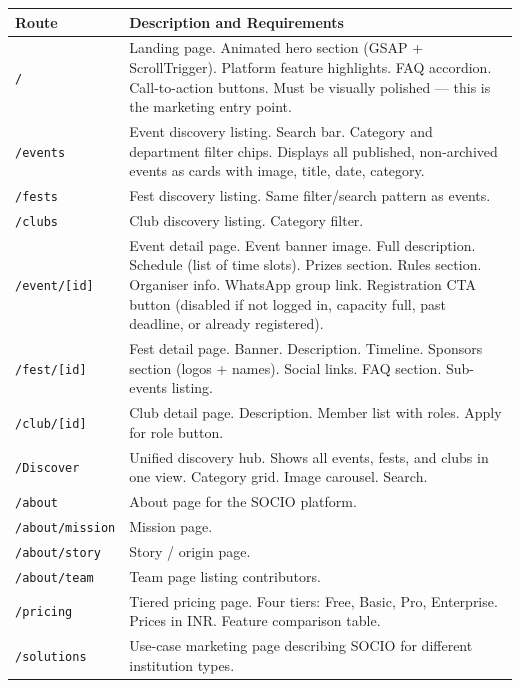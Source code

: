 \documentclass[12pt,a4paper]{article}
\begin{document}
\begin{longtable}{L{5cm} X}
\toprule
{}
\textbf{Route} & \textbf{Description and Requirements} \\
\midrule
\endhead
\texttt{/} & Landing page. Animated hero section (GSAP + ScrollTrigger). Platform feature highlights. FAQ accordion. Call-to-action buttons. Must be visually polished — this is the marketing entry point. \\
\addlinespace
\texttt{/events} & Event discovery listing. Search bar. Category and department filter chips. Displays all published, non-archived events as cards with image, title, date, category. \\
\addlinespace
\texttt{/fests} & Fest discovery listing. Same filter/search pattern as events. \\
\addlinespace
\texttt{/clubs} & Club discovery listing. Category filter. \\
\addlinespace
\texttt{/event/[id]} & Event detail page. Event banner image. Full description. Schedule (list of time slots). Prizes section. Rules section. Organiser info. WhatsApp group link. Registration CTA button (disabled if not logged in, capacity full, past deadline, or already registered). \\
\addlinespace
\texttt{/fest/[id]} & Fest detail page. Banner. Description. Timeline. Sponsors section (logos + names). Social links. FAQ section. Sub-events listing. \\
\addlinespace
\texttt{/club/[id]} & Club detail page. Description. Member list with roles. Apply for role button. \\
\addlinespace
\texttt{/Discover} & Unified discovery hub. Shows all events, fests, and clubs in one view. Category grid. Image carousel. Search. \\
\addlinespace
\texttt{/about} & About page for the SOCIO platform. \\
\addlinespace
\texttt{/about/mission} & Mission page. \\
\addlinespace
\texttt{/about/story} & Story / origin page. \\
\addlinespace
\texttt{/about/team} & Team page listing contributors. \\
\addlinespace
\texttt{/pricing} & Tiered pricing page. Four tiers: Free, Basic, Pro, Enterprise. Prices in INR. Feature comparison table. \\
\addlinespace
\texttt{/solutions} & Use-case marketing page describing SOCIO for different institution types. \\

\end{longtable}
\end{document}
